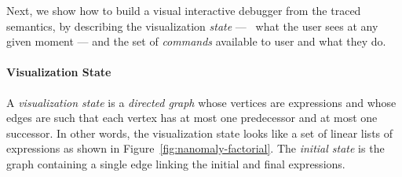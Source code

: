 Next, we show how to build a visual interactive debugger
from the traced semantics, by describing the visualization
\emph{state} --- \ie\ what the user sees at any given moment ---
and the set of \emph{commands} available to user and what
they do.

\paragraph{Visualization State}
%
A \emph{visualization state} %
is a \emph{directed graph}
whose vertices are expressions and whose edges are such
that each vertex has at most one predecessor and at most one
successor. In other words, the visualization state looks
like a set of linear lists of expressions as shown in
Figure~\ref{fig:nanomaly-factorial}.
%
The \emph{initial state} is the graph containing a single
edge linking the initial and final expressions.

